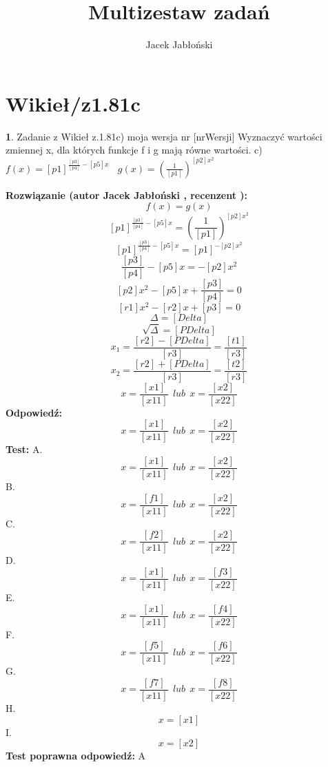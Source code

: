 \documentclass[12pt, a4paper]{article}
\title{Multizestaw zadań}
\author{Jacek Jabłoński}
\date{}
\theoremstyle{definition} %
\newtheorem{zad}{}
\newcommand{\kategoria}[1]{\section{#1}} %
\newcommand{\zadStart}[1]{\begin{zad}#1\newline} %
\newcommand{\zadStop}{\end{zad}}   %
\newcommand{\rozwStart}[2]{\noindent \textbf{Rozwiązanie (autor #1 , recenzent #2): }\newline} %
\newcommand{\rozwStop}{\newline}                                            %
\newcommand{\odpStart}{\noindent \textbf{Odpowiedź:}\newline}    %
\newcommand{\odpStop}{\newline}                                             %
\newcommand{\testStart}{\noindent \textbf{Test:}\newline} %
\newcommand{\testStop}{\newline} %
\newcommand{\kluczStart}{\noindent \textbf{Test poprawna odpowiedź:}\newline} %
\newcommand{\kluczStop}{\newline} %
\begin{document}
\maketitle


\kategoria{Wikieł/z1.81c}
\zadStart{Zadanie z Wikieł z.1.81c) moja wersja nr [nrWersji]}
Wyznaczyć wartości zmiennej x, dla których funkcje f i g mają równe wartości.
c)$f(x)=[p1]^{\frac{[p3]}{[p4]}-[p5]x} \ \ \ \ g(x)=(\frac{1}{[p1]})^{[p2]x^2}$
\zadStop
\rozwStart{Jacek Jabłoński}{}
$$f(x)=g(x)$$
$$[p1]^{\frac{[p3]}{[p4]}-[p5]x} = (\frac{1}{[p1]})^{[p2]x^2}$$
$$[p1]^{\frac{[p3]}{[p4]}-[p5]x} = [p1]^{-[p2]x^2}$$
$$\frac{[p3]}{[p4]}-[p5]x = -[p2]x^2$$
$$[p2]x^2-[p5]x+\frac{[p3]}{[p4]} = 0$$
$$[r1]x^2-[r2]x+[p3] = 0$$
$$\Delta = [Delta]$$
$$\sqrt{\Delta} = [PDelta]$$
$$x_1 = \frac{[r2]-[PDelta]}{[r3]} = \frac{[t1]}{[r3]}$$
$$x_2 = \frac{[r2]+[PDelta]}{[r3]} = \frac{[t2]}{[r3]}$$
$$x = \frac{[x1]}{[x11]} \ \ lub \ \ x = \frac{[x2]}{[x22]}$$
\rozwStop
\odpStart
$$x = \frac{[x1]}{[x11]} \ \ lub \ \ x = \frac{[x2]}{[x22]}$$
\odpStop
\testStart
A. $$x = \frac{[x1]}{[x11]} \ \ lub \ \ x = \frac{[x2]}{[x22]}$$
B. $$x = \frac{[f1]}{[x11]} \ \ lub \ \ x = \frac{[x2]}{[x22]}$$
C. $$x = \frac{[f2]}{[x11]} \ \ lub \ \ x = \frac{[x2]}{[x22]}$$
D. $$x = \frac{[x1]}{[x11]} \ \ lub \ \ x = \frac{[f3]}{[x22]}$$
E. $$x = \frac{[x1]}{[x11]} \ \ lub \ \ x = \frac{[f4]}{[x22]}$$
F. $$x = \frac{[f5]}{[x11]} \ \ lub \ \ x = \frac{[f6]}{[x22]}$$
G. $$x = \frac{[f7]}{[x11]} \ \ lub \ \ x = \frac{[f8]}{[x22]}$$
H. $$x = [x1]$$
I. $$x = [x2]$$
\testStop
\kluczStart
A
\kluczStop
\end{document}
